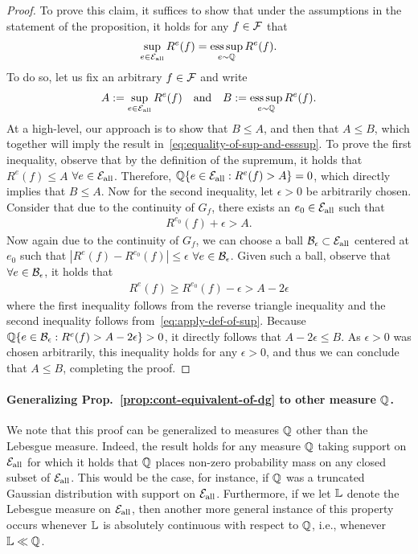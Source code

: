 \documentclass{article}
\begin{document}
\begin{proof}
To prove this claim, it suffices to show that under the assumptions in the statement of the proposition, it holds for any $f\in\mathcal{F}$ that 
%
\begin{align}
    \sup_{e\in{\mathcal{E}_\text{all}}} R^e(f) = \operatorname*{ess\,sup}_{e\sim\mathbb{Q}} R^e(f). \label{eq:equality-of-sup-and-esssup}
\end{align} 
%
To do so, let us fix an arbitrary $f\in\mathcal{F}$ and write
%
\begin{align}
    A := \sup_{e\in{\mathcal{E}_\text{all}}} R^e(f) \quad\text{and}\quad B := \operatorname*{ess\,sup}_{e\sim\mathbb{Q}} R^e(f).
\end{align}
%
At a high-level, our approach is to show that $B \leq A$, and then that $A\leq B$, which together will imply the result in~\eqref{eq:equality-of-sup-and-esssup}.  To prove the first inequality, observe that by the definition of the supremum, it holds that $R^e(f) \leq A$ $\forall e\in{\mathcal{E}_\text{all}}$.  Therefore, $\mathbb{Q}\{e\in{\mathcal{E}_\text{all}} : R^e(f) > A\} = 0$, which directly implies that $B\leq A$.  Now for the second inequality, let $\epsilon>0$ be arbitrarily chosen.  Consider that due to the continuity of $G_f$, there exists an $e_0\in{\mathcal{E}_\text{all}}$ such that
%
\begin{align}
    R^{e_0}(f) +\epsilon > A. \label{eq:apply-def-of-sup}
\end{align}
%
Now again due to the continuity of $G_f$, we can choose a ball $\mathcal{B}_\epsilon\subset{\mathcal{E}_\text{all}}$ centered at $e_0$ such that $|R^e(f)-R^{e_0}(f)| \leq \epsilon$ $\forall e\in\mathcal{B}_\epsilon$.  Given such a ball, observe that $\forall e\in\mathcal{B}_\epsilon$, it holds that
%
\begin{align}
    R^e(f) \geq R^{e_0}(f) - \epsilon > A - 2\epsilon 
\end{align}
%
where the first inequality follows from the reverse triangle inequality and the second inequality follows from~\eqref{eq:apply-def-of-sup}.  Because $\mathbb{Q}\{e\in\mathcal{B}_\epsilon : R^e(f) > A-2\epsilon\} > 0$, it directly follows that $A-2\epsilon \leq B$.  As $\epsilon>0$ was chosen arbitrarily, this inequality holds for any $\epsilon>0$, and thus we can conclude that $A\leq B$, completing the proof.
\end{proof}


\paragraph{Generalizing Prop.\  \ref{prop:cont-equivalent-of-dg} to other measure $\mathbb{Q}$.} We note that this proof can be generalized to measures $\mathbb{Q}$ other than the Lebesgue measure.  Indeed, the result holds for any measure $\mathbb{Q}$ taking support on ${\mathcal{E}_\text{all}}$ for which it holds that $\mathbb{Q}$ places non-zero probability mass on any closed subset of ${\mathcal{E}_\text{all}}$.  This would be the case, for instance, if $\mathbb{Q}$ was a truncated Gaussian distribution with support on ${\mathcal{E}_\text{all}}$.  Furthermore, if we let $\mathbb{L}$ denote the Lebesgue measure on ${\mathcal{E}_\text{all}}$, then another more general instance of this property occurs whenever $\mathbb{L}$ is absolutely continuous with respect to $\mathbb{Q}$, i.e., whenever $\mathbb{L} \ll \mathbb{Q}$.
\end{document}
